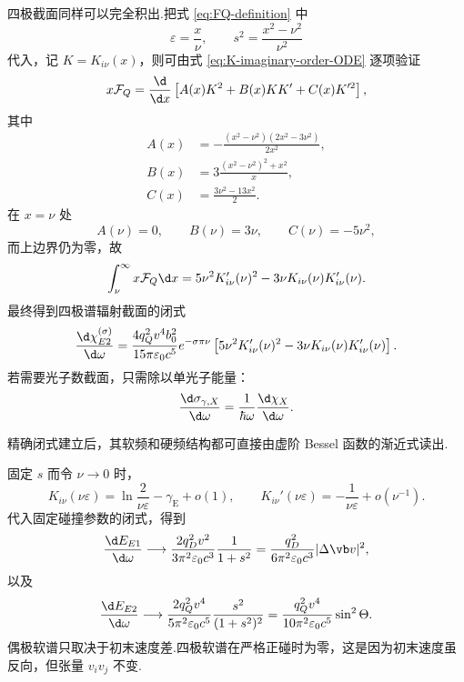四极截面同样可以完全积出.把式 \eqref{eq:FQ-definition} 中
\begin{equation}
 \varepsilon=\frac{x}{\nu},
 \qquad
 s^2=\frac{x^2-\nu^2}{\nu^2}
\end{equation}
代入，记 $K=K_{i\nu}(x)$，则可由式 \eqref{eq:K-imaginary-order-ODE} 逐项验证
\begin{equation}
 x\mathcal F_Q
 =\frac{\d}{\d x}
 \left[A(x)K^2+B(x)KK'+C(x)K'^2\right],
 \label{eq:FQ-total-derivative}
\end{equation}
其中
\begin{equation}
 \begin{aligned}
 A(x)&=-\frac{(x^2-\nu^2)(2x^2-3\nu^2)}{2x^2},\\
 B(x)&=3\frac{(x^2-\nu^2)^2+x^2}{x},\\
 C(x)&=\frac{3\nu^2-13x^2}{2}.
 \end{aligned}
 \label{eq:FQ-antiderivative-coefficients}
\end{equation}
在 $x=\nu$ 处
\begin{equation}
 A(\nu)=0,
 \qquad
 B(\nu)=3\nu,
 \qquad
 C(\nu)=-5\nu^2,
\end{equation}
而上边界仍为零，故
\begin{equation}
 \int_\nu^\infty x\mathcal F_Q\d x
 =5\nu^2K_{i\nu}'(\nu)^2
 -3\nu K_{i\nu}(\nu)K_{i\nu}'(\nu).
 \label{eq:E2-cross-section-integral-result}
\end{equation}
最终得到四极谱辐射截面的闭式
\begin{equation}
 \frac{\d\chi_{E2}^{(\sigma)}}{\d\omega}
 =\frac{4q_Q^2v^4b_0^2}{15\pi\varepsilon_0c^5}
 e^{-\sigma\pi\nu}
 \left[
 5\nu^2K_{i\nu}'(\nu)^2
 -3\nu K_{i\nu}(\nu)K_{i\nu}'(\nu)
 \right].
 \label{eq:exact-E2-cross-section-closed}
\end{equation}
若需要光子数截面，只需除以单光子能量：
\begin{equation}
 \frac{\d\sigma_{\gamma,X}}{\d\omega}
 =\frac{1}{\hbar\omega}\frac{\d\chi_X}{\d\omega}.
\end{equation}

精确闭式建立后，其软频和硬频结构都可直接由虚阶 Bessel 函数的渐近式读出.

固定 $s$ 而令 $\nu\to0$ 时，
\begin{equation}
 K_{i\nu}(\nu\varepsilon)
 =\ln\frac{2}{\nu\varepsilon}-\gamma_{\mathrm E}+o(1),
 \qquad
 K_{i\nu}'(\nu\varepsilon)
 =-\frac{1}{\nu\varepsilon}+o(\nu^{-1}).
 \label{eq:K-small-nu-fixed-s}
\end{equation}
代入固定碰撞参数的闭式，得到
\begin{equation}
 \frac{\d E_{E1}}{\d\omega}
 \longrightarrow
 \frac{2q_D^2v^2}{3\pi^2\varepsilon_0c^3}
 \frac{1}{1+s^2}
 =\frac{q_D^2}{6\pi^2\varepsilon_0c^3}|\Delta\vb v|^2,
 \label{eq:E1-soft-fixed-b}
\end{equation}
以及
\begin{equation}
 \frac{\d E_{E2}}{\d\omega}
 \longrightarrow
 \frac{2q_Q^2v^4}{5\pi^2\varepsilon_0c^5}
 \frac{s^2}{(1+s^2)^2}
 =\frac{q_Q^2v^4}{10\pi^2\varepsilon_0c^5}\sin^2\Theta.
 \label{eq:E2-soft-fixed-b}
\end{equation}
偶极软谱只取决于初末速度差.四极软谱在严格正碰时为零，这是因为初末速度虽反向，但张量 $v_iv_j$ 不变.

